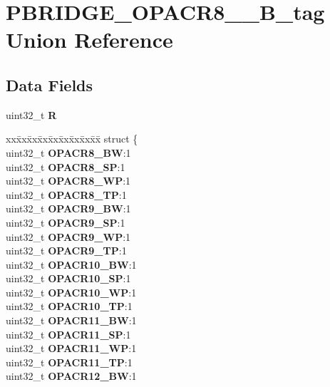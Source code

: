 \hypertarget{unionPBRIDGE__OPACR8__15__32B__tag}{}\section{P\+B\+R\+I\+D\+G\+E\+\_\+\+O\+P\+A\+C\+R8\+\_\+\_\+B\+\_\+tag Union Reference}
\label{unionPBRIDGE__OPACR8__15__32B__tag}
\subsection*{Data Fields}
\begin{DoxyCompactItemize}
\item 
\mbox{\label{unionPBRIDGE__OPACR8__15__32B__tag_afe23cab4f71ddfdff5e248e492b16d73}} 
uint32\+\_\+t {\bfseries R}
\item 
\mbox{\label{unionPBRIDGE__OPACR8__15__32B__tag_a3d219778be1cc8acda69bf4f8b8d8e14}} 
\begin{tabbing}
xx\=xx\=xx\=xx\=xx\=xx\=xx\=xx\=xx\=\kill
struct \{\\
\>uint32\_t {\bfseries OPACR8\_BW}:1\\
\>uint32\_t {\bfseries OPACR8\_SP}:1\\
\>uint32\_t {\bfseries OPACR8\_WP}:1\\
\>uint32\_t {\bfseries OPACR8\_TP}:1\\
\>uint32\_t {\bfseries OPACR9\_BW}:1\\
\>uint32\_t {\bfseries OPACR9\_SP}:1\\
\>uint32\_t {\bfseries OPACR9\_WP}:1\\
\>uint32\_t {\bfseries OPACR9\_TP}:1\\
\>uint32\_t {\bfseries OPACR10\_BW}:1\\
\>uint32\_t {\bfseries OPACR10\_SP}:1\\
\>uint32\_t {\bfseries OPACR10\_WP}:1\\
\>uint32\_t {\bfseries OPACR10\_TP}:1\\
\>uint32\_t {\bfseries OPACR11\_BW}:1\\
\>uint32\_t {\bfseries OPACR11\_SP}:1\\
\>uint32\_t {\bfseries OPACR11\_WP}:1\\
\>uint32\_t {\bfseries OPACR11\_TP}:1\\
\>uint32\_t {\bfseries OPACR12\_BW}:1\\

\end{tabbing}
\end{DoxyCompactItemize}
